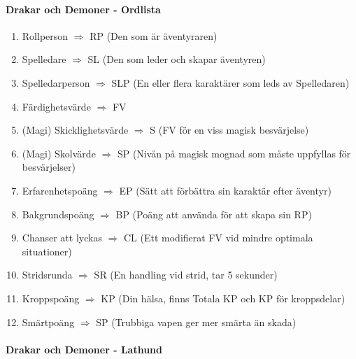 \documentclass[a4paper, 10pt, titlepage]{article}
\begin{document}
\paragraph{Drakar och Demoner - Ordlista}
\begin{enumerate}[I]
\item Rollperson $\Rightarrow$ RP (Den som är äventyraren)
\item Spelledare $\Rightarrow$ SL (Den som leder och skapar äventyren)
\item Spelledarperson $\Rightarrow$ SLP (En eller flera karaktärer som leds av Spelledaren)
\item Färdighetsvärde $\Rightarrow$ FV
\item (Magi) Skicklighetsvärde $\Rightarrow$ S (FV för en viss magisk besvärjelse)
\item (Magi) Skolvärde $\Rightarrow$ SP (Nivån på magisk mognad som måste uppfyllas för besvärjelser)
\item Erfarenhetspoäng $\Rightarrow$ EP (Sätt att förbättra sin karaktär efter äventyr)
\item Bakgrundspoäng $\Rightarrow$ BP (Poäng att använda för att skapa sin RP)
\item Chanser att lyckas $\Rightarrow$ CL (Ett modifierat FV vid mindre optimala situationer)
\item Stridsrunda $\Rightarrow$ SR (En handling vid strid, tar 5 sekunder)
\item Kroppspoäng $\Rightarrow$ KP (Din hälsa, finns Totala KP och KP för kroppsdelar)
\item Smärtpoäng $\Rightarrow$ SP (Trubbiga vapen ger mer smärta än skada)
\end{enumerate}

\paragraph{Drakar och Demoner - Lathund}
\end{document}
